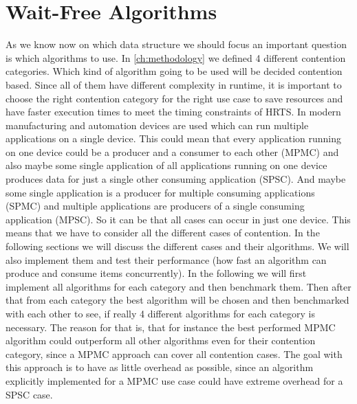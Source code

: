 \section{Wait-Free Algorithms}\label{sec:wait-free-alg}
As we know now on which data structure we should focus an important question is which algorithms to use. In \cref{ch:methodology} we defined 4 different contention categories. Which kind of algorithm going to be used will be decided contention based. Since all of them have different complexity in runtime, it is important to choose the right contention category for the right use case to save resources and have faster execution times to meet the timing constraints of \ac{HRTS}. In modern manufacturing and automation devices are used which can run multiple applications on a single device. This could mean that every application running on one device could be a producer and a consumer to each other (\ac{MPMC}) and also maybe some single application of all applications running on one device produces data for just a single other consuming application (\ac{SPSC}). And maybe some single application is a producer for multiple consuming applications (\ac{SPMC}) and multiple applications are producers of a single consuming application (\ac{MPSC}). So it can be that all cases can occur in just one device. This means that we have to consider all the different cases of contention. In the following sections we will discuss the different cases and their algorithms. We will also implement them and test their performance (how fast an algorithm can produce and consume items concurrently). In the following we will first implement all algorithms for each category and then benchmark them. Then after that from each category the best algorithm will be chosen and then benchmarked with each other to see, if really 4 different algorithms for each category is necessary. The reason for that is, that for instance the best performed \ac{MPMC} algorithm could outperform all other algorithms even for their contention category, since a \ac{MPMC} approach can cover all contention cases. The goal with this approach is to have as little overhead as possible, since an algorithm explicitly implemented for a \ac{MPMC} use case could have extreme overhead for a \ac{SPSC} case.

